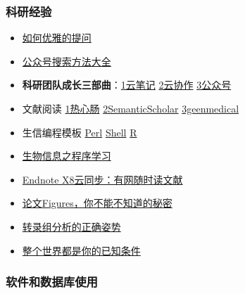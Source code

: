 \documentclass[]{article}
\providecommand{\tightlist}{%
  \setlength{\itemsep}{0pt}\setlength{\parskip}{0pt}}
\numberwithin{figure}{section}
\numberwithin{table}{section}
\begin{document}
\hypertarget{ux79d1ux7814ux7ecfux9a8c}{%
\subsubsection{科研经验}\label{ux79d1ux7814ux7ecfux9a8c}}

\begin{itemize}
\tightlist
\item
  \href{http://mp.weixin.qq.com/s/H9gkepap0hy3NNskOkO44w}{如何优雅的提问}
\item
  \href{http://mp.weixin.qq.com/s/wn2bqIPgT5UD-GP1qzkJFA}{公众号搜索方法大全}
\item
  \textbf{科研团队成长三部曲}：\href{http://mp.weixin.qq.com/s/OnwhWlq3cTycf-W1rxgV7g}{1云笔记} \href{http://mp.weixin.qq.com/s/W5By9mZ5PI57_xFfZ_JXiw}{2云协作} \href{http://mp.weixin.qq.com/s/hd0sdBDAMqMJsXQs0pIjUg}{3公众号}
\item
  文献阅读 \href{http://mp.weixin.qq.com/s/1uBeAQ0utxuzTTtfUx_UXA}{1热心肠} \href{https://mp.weixin.qq.com/s/gaQiUrRqLpfTXzjyfbua6A}{2SemanticScholar} \href{https://mp.weixin.qq.com/s/hc8g64aHN7qv8YhVfrsuvQ}{3geenmedical}
\item
  生信编程模板 \href{http://mp.weixin.qq.com/s/u2ZmTo-z6cbN-L6KVLYNwg}{Perl} \href{http://mp.weixin.qq.com/s/YevGR79NnBAF-xtrqL8gAA}{Shell} \href{http://mp.weixin.qq.com/s/OQiE882jM6pVwqTiIjyZ1Q}{R}
\item
  \href{http://mp.weixin.qq.com/s/xoLBg0pI9seEksa0hMXi0A}{生物信息之程序学习}\\
\item
  \href{http://mp.weixin.qq.com/s/SPblPs5ByPdb2C400kIK3w}{Endnote X8云同步：有网随时读文献}
\item
  \href{http://mp.weixin.qq.com/s/UQtKZ14_6WTyFYGZgiC00g}{论文Figures，你不能不知道的秘密}
\item
  \href{http://mp.weixin.qq.com/s/sTzluM0EMNYLnwYa5JaKLg}{转录组分析的正确姿势}
\item
  \href{http://mp.weixin.qq.com/s/9Sj5tI8RRa3uv2BgNarhxw}{整个世界都是你的已知条件}
\end{itemize}

\hypertarget{ux8f6fux4ef6ux548cux6570ux636eux5e93ux4f7fux7528}{%
\subsubsection{软件和数据库使用}\label{ux8f6fux4ef6ux548cux6570ux636eux5e93ux4f7fux7528}}
\end{document}
